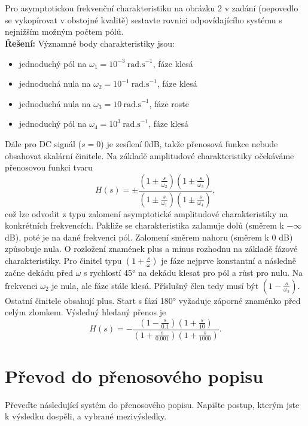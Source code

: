 \documentclass[twoside]{article}
\begin{document}
\subsection{~}

Pro asymptotickou frekvenční charakteristiku na obrázku 2 v zadání (nepovedlo se vykopírovat v obstojné kvalitě)
sestavte rovnici odpovídajícího systému s nejnižším možným počtem pólů. \\
\textbf{Řešení:} Významné body charakteristiky jsou:
\begin{itemize}
	\item jednoduchý pól na $\omega_1 = 10^{-3}~\text{rad.s}^{-1}$, fáze klesá
	\item jednoduchá nula na $\omega_2 = 10^{-1}~\text{rad.s}^{-1}$, fáze klesá
	\item jednoduchá nula na $\omega_3 = 10~\text{rad.s}^{-1}$, fáze roste
	\item jednoduchý pól na $\omega_4 = 10^3~\text{rad.s}^{-1}$, fáze klesá
\end{itemize}
Dále pro DC signál ($s = 0$) je zesílení 0dB, takže přenosová funkce nebude obsahovat skalární činitele.
Na základě amplitudové charakteristiky očekáváme přenosovou funkci tvaru
\begin{equation*}
	H(s) = \pm \frac{(1 \pm \frac{s}{\omega_2})(1 \pm \frac{s}{\omega_3})}{(1 \pm \frac{s}{\omega_1})(1 \pm \frac{s}{\omega_4})},
\end{equation*}
což lze odvodit z typu zalomení asymptotické amplitudové charakteristiky na konkrétních frekvencích. Pakliže se charakteristika
zalamuje dolů (směrem k $-\infty$ dB), poté je na dané frekvenci pól. Zalomení směrem nahoru (směrem k 0 dB) způsobuje nula.
O rozložení znamének plus a minus rozhodnu na základě fázové charakteristiky. Pro činitel typu $(1 + \frac{s}{\omega})$ je fáze
nejprve konstantní a následně začne dekádu před $\omega$ s rychlostí 45° na dekádu klesat pro pól a růst pro nulu.
Na frekvenci $\omega_2$ je nula, ale fáze stále klesá. Příslušný člen tedy musí být $(1 - \frac{s}{\omega_2})$.
Ostatní činitele obsahují plus. Start s fází 180° vyžaduje záporné znaménko před celým zlomkem. Výsledný hledaný přenos je
\begin{equation*}
	H(s) = - \frac{(1-\frac{s}{0.1})(1 +\frac{s}{10})}{(1+\frac{s}{0.001})(1 + \frac{s}{1000})}.
\end{equation*}

\section{ Převod do přenosového popisu}
\label{sec:ukol5}
Převeďte následující systém do přenosového popisu. Napište postup, kterým jste k výsledku dospěli, a vybrané mezivýsledky.
\end{document}
